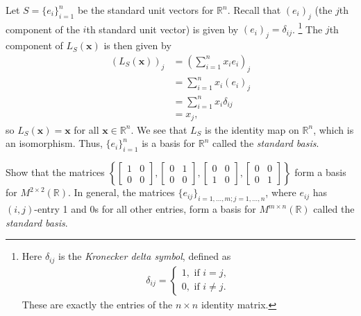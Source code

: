 \documentclass[12pt,letterpaper,reqno]{article}
\numberwithin{equation}{section}
\newcommand{\R}{\ensuremath{\mathbb R}}
\begin{document}
\begin{example}
Let $S=\{e_i\}_{i=1}^n$ be the standard unit vectors for $\R^n$. Recall that $(e_{i})_j$ (the $j$th component of the $i$th standard unit vector) is given by $(e_i)_j=\delta_{ij}$. \footnote{Here $\delta_{ij}$ is the \emph{Kronecker delta symbol}, defined as
 \begin{align*}
	\delta_{ij}=\begin{cases}
		1, \text{ if }i=j, \\
		0, \text{ if }i\neq j.
	\end{cases}
\end{align*} These are exactly the entries of the $n \times n$ identity matrix.} The $j$th component of $L_S(\mathbf{x})$ is then given by
\begin{align*}
	(L_S(\mathbf{x}))_j&=(\sum_{i=1}^nx_ie_i)_j \\
	&=\sum_{i=1}^nx_i(e_i)_j \\
	&=\sum_{i=1}^nx_i\delta_{ij} \\
	&=x_j,
\end{align*}
so $L_S(\mathbf{x})=\mathbf{x}$ for all $\mathbf{x} \in \R^n$. We see that $L_S$ is the identity map on $\R^n$, which is an isomorphism. Thus, $\{e_i\}_{i=1}^n$ is a basis for $\R^n$ called the \emph{standard basis}.
\end{example}

\begin{exercise}
Show that the matrices $\left\{\begin{bmatrix}
		1 & 0 \\ 0 & 0
	\end{bmatrix}, \begin{bmatrix}
		0 & 1 \\ 0 & 0
	\end{bmatrix}, \begin{bmatrix}
		0 & 0 \\ 1 & 0
	\end{bmatrix}, \begin{bmatrix}
		0 & 0 \\ 0 & 1
	\end{bmatrix}\right\}$ form a basis for $M^{2 \times 2}(\R)$. In general, the matrices $\{e_{ij}\}_{i=1,\dots,m; j=1,\dots,n}$, where $e_{ij}$ has $(i,j)$-entry 1 and 0s for all other entries, form a basis for $M^{m \times n}(\R)$ called the \emph{standard basis}.
\end{exercise}
\end{document}
